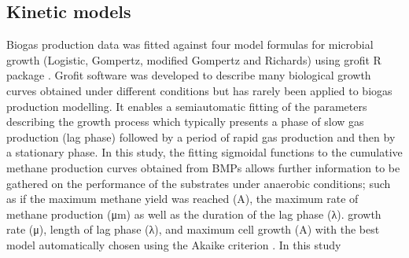 \subsection{Kinetic models}
Biogas production data was fitted against four model formulas for microbial growth (Logistic, Gompertz, modified Gompertz and Richards) using grofit R package \cite{Kahm_2010}. Grofit software was developed to describe many biological growth curves obtained under different conditions but has rarely been applied to biogas production modelling. It enables a semiautomatic fitting of the parameters describing the growth process which typically presents a phase of slow gas production (lag phase) followed by a period of rapid gas production and then by a stationary phase. In this study, the fitting sigmoidal functions to the cumulative methane production curves obtained from BMPs allows further information to be gathered on the performance of the substrates under anaerobic conditions; such as if the maximum methane yield was reached (A), the maximum rate of methane production (μm) as well as the duration of the lag phase (λ). growth rate (μ), length of lag phase (λ), and maximum cell growth (A) with the best model automatically chosen using the Akaike criterion \cite{Hasenbrink_2006}. In this study